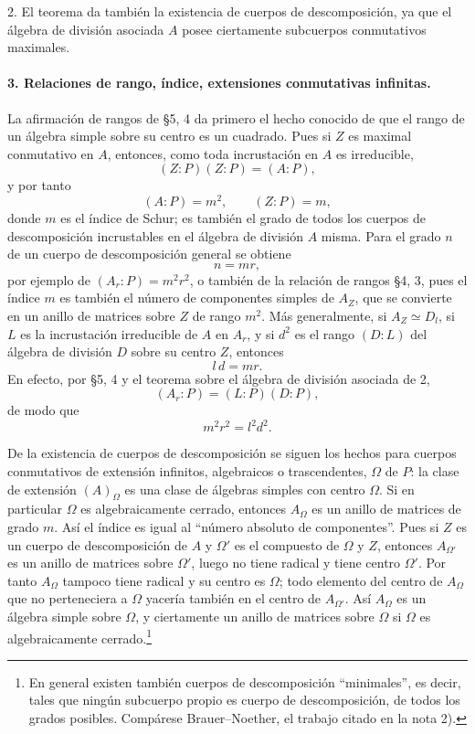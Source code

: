 2. El teorema da también la existencia de cuerpos de descomposición, ya que el álgebra de división asociada \(A\) posee ciertamente subcuerpos conmutativos maximales.

\paragraph{3. Relaciones de rango, índice, extensiones conmutativas infinitas.}
La afirmación de rangos de §5, 4 da primero el hecho conocido de que el rango de un álgebra simple sobre su centro es un cuadrado. Pues si \(Z\) es maximal conmutativo en \(A\), entonces, como toda incrustación en \(A\) es irreducible,
\[
        (Z:P)(Z:P)=(A:P),
\]
y por tanto
\[
        (A:P)=m^2,
        \qquad (Z:P)=m,
\]
donde \(m\) es el índice de Schur; es también el grado de todos los cuerpos de descomposición incrustables en el álgebra de división \(A\) misma. Para el grado \(n\) de un cuerpo de descomposición general se obtiene
\[
        n=mr,
\]
por ejemplo de \((A_r:P)=m^2r^2\), o también de la relación de rangos §4, 3, pues el índice \(m\) es también el número de componentes simples de \(A_Z\), que se convierte en un anillo de matrices sobre \(Z\) de rango \(m^2\). Más generalmente, si \(A_Z\simeq D_l\), si \(L\) es la incrustación irreducible de \(A\) en \(A_r\), y si \(d^2\) es el rango \((D:L)\) del álgebra de división \(D\) sobre su centro \(Z\), entonces
\[
        l\,d=mr .
\]
En efecto, por §5, 4 y el teorema sobre el álgebra de división asociada de 2,
\[
        (A_r:P)=(L:P)(D:P),
\]
de modo que
\[
        m^2r^2=l^2d^2 .
\]

De la existencia de cuerpos de descomposición se siguen los hechos para cuerpos conmutativos de extensión infinitos, algebraicos o trascendentes, \(\Omega\) de \(P\): la clase de extensión \((A)_\Omega\) es una clase de álgebras simples con centro \(\Omega\). Si en particular \(\Omega\) es algebraicamente cerrado, entonces \(A_\Omega\) es un anillo de matrices de grado \(m\). Así el índice es igual al “número absoluto de componentes”. Pues si \(Z\) es un cuerpo de descomposición de \(A\) y \(\Omega'\) es el compuesto de \(\Omega\) y \(Z\), entonces \(A_{\Omega'}\) es un anillo de matrices sobre \(\Omega'\), luego no tiene radical y tiene centro \(\Omega'\). Por tanto \(A_\Omega\) tampoco tiene radical y su centro es \(\Omega\); todo elemento del centro de \(A_\Omega\) que no perteneciera a \(\Omega\) yacería también en el centro de \(A_{\Omega'}\). Así \(A_\Omega\) es un álgebra simple sobre \(\Omega\), y ciertamente un anillo de matrices sobre \(\Omega\) si \(\Omega\) es algebraicamente cerrado.\footnote{En general existen también cuerpos de descomposición “minimales”, es decir, tales que ningún subcuerpo propio es cuerpo de descomposición, de todos los grados posibles. Compárese Brauer--Noether, el trabajo citado en la nota 2).}

